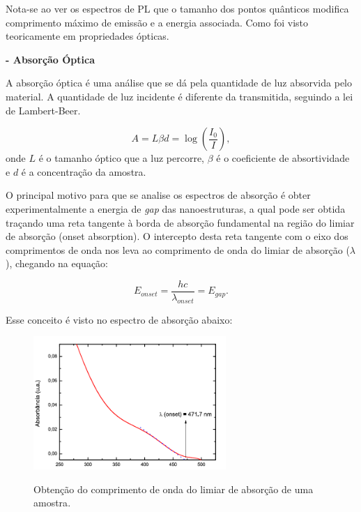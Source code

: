 		\par Nota-se ao ver os espectros de PL que o tamanho dos pontos quânticos modifica  comprimento máximo de emissão e a energia associada. Como foi visto teoricamente em propriedades ópticas.

	\par \textbf{- Absorção Óptica}

		\par A absorção óptica é uma análise que se dá pela quantidade de luz absorvida pelo material. A quantidade de luz incidente é diferente da transmitida, seguindo a lei de Lambert-Beer.

		\begin{equation}
			\label{sintese_1}
			A = L\beta d = \log \left(\frac{I_{0}}{I} \right),
		\end{equation}
		onde $L$ é o tamanho óptico que a luz percorre, $\beta$ é o coeficiente de absortividade e $d$ é a concentração da amostra.

		\par O principal motivo para que se analise os espectros de absorção é obter experimentalmente a energia de \textit{gap} das nanoestruturas, a qual pode ser obtida traçando uma reta tangente à borda de absorção fundamental na região do limiar de absorção (onset absorption). O intercepto desta reta tangente com o eixo dos comprimentos de onda nos leva ao comprimento de onda do limiar de absorção ($\lambda$), chegando na equação:

		\begin{equation}
			\label{sintese_2}
			E_{onset} = \frac{hc}{\lambda_{onset}} = E_{gap}.
		\end{equation}

		\par Esse conceito é visto no espectro de absorção abaixo:

		\begin{figure}[H]
		  \centering
		  \caption{Obtenção do comprimento de onda do limiar de absorção de uma amostra\cite{confinamento5}.}
		  \includegraphics[width=0.65\textwidth]{images/figura21.png}
		  \label{fig21}
		\end{figure}


